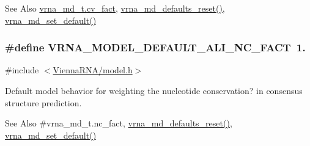 \begin{DoxySeeAlso}{See Also}
\hyperlink{group__model__details_a62ebefb9d0643e5c4c8a2ec84a105ce6}{vrna\-\_\-md\-\_\-t.\-cv\-\_\-fact}, \hyperlink{group__model__details_ga70834424cf804d149937de89f80ceb45}{vrna\-\_\-md\-\_\-defaults\-\_\-reset()}, \hyperlink{group__model__details_ga8ac6ff84936282436f822644bf841f66}{vrna\-\_\-md\-\_\-set\-\_\-default()} 
\end{DoxySeeAlso}
\hypertarget{group__model__details_ga8f774daaafec28160c1ca5d09f2cbdba}{
\subsubsection[{V\-R\-N\-A\-\_\-\-M\-O\-D\-E\-L\-\_\-\-D\-E\-F\-A\-U\-L\-T\-\_\-\-A\-L\-I\-\_\-\-N\-C\-\_\-\-F\-A\-C\-T}]{\setlength{\rightskip}{0pt plus 5cm}\#define V\-R\-N\-A\-\_\-\-M\-O\-D\-E\-L\-\_\-\-D\-E\-F\-A\-U\-L\-T\-\_\-\-A\-L\-I\-\_\-\-N\-C\-\_\-\-F\-A\-C\-T~1.}}\label{group__model__details_ga8f774daaafec28160c1ca5d09f2cbdba}


{\ttfamily \#include $<$\hyperlink{model_8h}{Vienna\-R\-N\-A/model.\-h}$>$}



Default model behavior for weighting the nucleotide conservation? in consensus structure prediction. 

\begin{DoxySeeAlso}{See Also}
\#vrna\-\_\-md\-\_\-t.\-nc\-\_\-fact, \hyperlink{group__model__details_ga70834424cf804d149937de89f80ceb45}{vrna\-\_\-md\-\_\-defaults\-\_\-reset()}, \hyperlink{group__model__details_ga8ac6ff84936282436f822644bf841f66}{vrna\-\_\-md\-\_\-set\-\_\-default()} 
\end{DoxySeeAlso}


